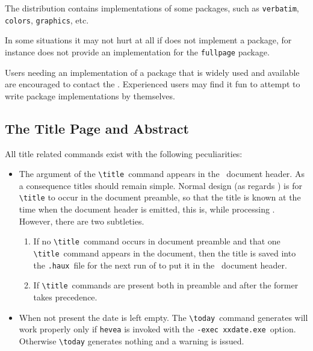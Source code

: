 The \hevea{} distribution contains implementations of some packages,
such as \texttt{verbatim}, \texttt{colors}, \texttt{graphics}, etc.

In some situations it may not hurt at all if \hevea{} does not
implement a package, for instance \hevea{} does not provide an
implementation for the \texttt{fullpage} package.

Users needing an implementation of a package that is widely used and
available are encouraged to contact the
.
Experienced users may find it fun to attempt to write package
implementations by themselves.


\subsection{The Title Page and Abstract}

All title related commands exist with the following peculiarities:

\begin{itemize}
\item The argument of the \verb+\title+~command
  appears in the \html~document header.  As a consequence titles
  should remain simple.  Normal design (as regards \hevea) is
  for \verb+\title+ to occur in the document preamble, so that the
  title is known at the time when the document header is emitted, this
  is, while processing \verb++.  However, there are
  two subtleties.

  \begin{enumerate}
  \item If no \verb+\title+~command occurs in document preamble and
    that one \verb+\title+~command appears in the document, then the
    title is saved into the \texttt{.haux}~file for the next run of
    \hevea{} to put it in the \html~document header.

  \item If \verb+\title+~commands are present both in preamble and
    after \verb++ the former takes precedence.
  \end{enumerate}

\item When not present the date is left empty.  The
  \verb+\today+~command generates will work properly
  only if \texttt{hevea} is invoked with the
  \verb+-exec xxdate.exe+~option.  Otherwise \verb+\today+ generates
  nothing and a warning is issued.
\end{itemize}

